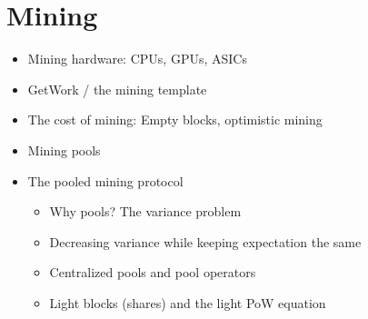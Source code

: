\chapter{Mining}

{\color{red}
\begin{itemize}
\item Mining hardware: CPUs, GPUs, ASICs
\item GetWork / the mining template
\item The cost of mining: Empty blocks, optimistic mining
\item Mining pools
\item The pooled mining protocol
    \begin{itemize}
    \item Why pools? The variance problem
    \item Decreasing variance while keeping expectation the same
    \item Centralized pools and pool operators
    \item Light blocks (shares) and the light PoW equation
    \end{itemize}
\end{itemize}
}
